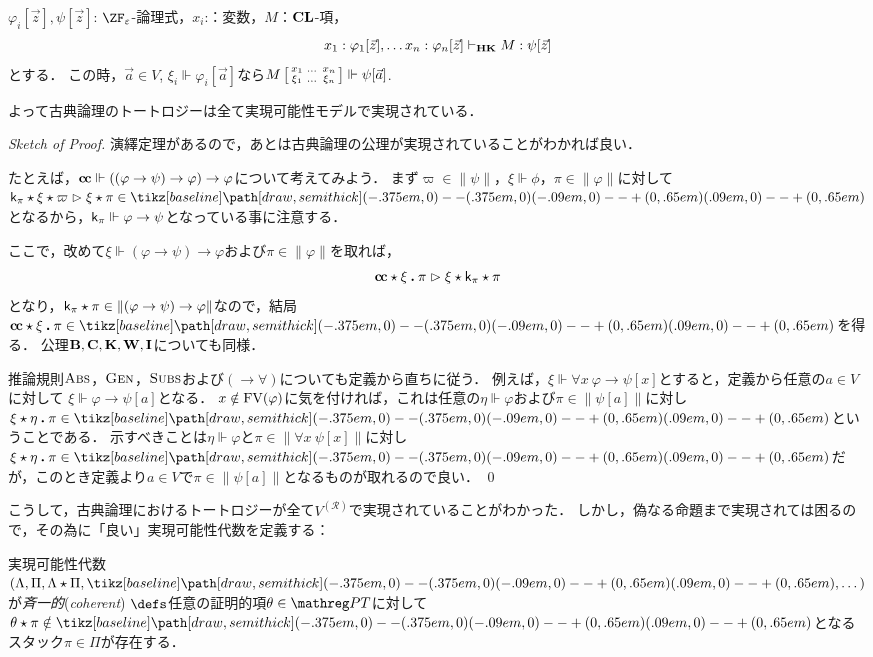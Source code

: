 \documentclass[realisability.tex]{subfiles}
\begin{document}
\begin{lemma}
 $\varphi_i[\vec{z}], \psi[\vec{z}]$: $\ZF_\varepsilon$-論理式，$x_i$:：変数，$M$：$\mathord{\mathbf{CL}}$-項，
 \[
  x_1 : \varphi_1[\vec{z}], \dots x_n : \varphi_n[\vec{z}] \vdash_{\mathord{\mathbf{HK}}} M: \psi[\vec{z}]
 \]
 とする．
 この時，$\vec{a} \in V$, $\xi_i \Vdash \varphi_i[\vec{a}]$なら$M\left[\begin{smallmatrix}x_1 & \dots & x_n\\\xi_1 & \dots & \xi_n\end{smallmatrix}\right] \Vdash \psi[\vec{a}]$.

 よって古典論理のトートロジーは全て実現可能性モデルで実現されている．
\end{lemma}
\begin{proof}[Sketch of Proof]
 演繹定理があるので，あとは古典論理の公理が実現されていることがわかれば良い．

 たとえば，$\mathsf{\mathbf{c\hspace{-1pt}c}} \Vdash ((\varphi \to \psi) \to \varphi) \to \varphi$について考えてみよう．
 まず$\varpi \in \|\psi\|$，$\xi \Vdash \phi$，$\pi \in \|\varphi\|$に対して$\conti_\pi \cons \xi \cons \varpi \reds \xi \cons \pi \in \pole$となるから，$\mathsf{k}_\pi \Vdash \varphi \to \psi$となっている事に注意する．

 ここで，改めて$\xi \Vdash (\varphi \to \psi) \to \varphi$および$\pi \in \|\varphi\|$を取れば，
 \[
  \mathsf{\mathbf{c\hspace{-1pt}c}} \mathbin{\star} \xi \mathbin{\boldsymbol{.}} \pi
 \mathrel{\rhd} \xi \mathbin{\star} \mathsf{k}_\pi \mathbin{\star} \pi
 \]
 となり，$\mathsf{k}_\pi \mathbin{\star} \pi \in \|(\varphi \to \psi) \to \varphi\|$なので，結局$\cc \cons \xi \push \pi \in \pole$を得る．
 公理$\mathsf{\mathbf{B}}, \mathsf{\mathbf{C}}, \mathsf{\mathbf{K}}, \mathsf{\mathbf{W}}, \mathsf{\mathbf{I}}$についても同様．

 推論規則$\mathord{\textsc{Abs}}$，$\mathord{\textsc{Gen}}$，$\mathord{\textsc{Subs}}$および$({\rightarrow}{\forall})$についても定義から直ちに従う．
 例えば，$\xi \Vdash \forall x \: \varphi \to \psi[x]$とすると，定義から任意の$a \in V$に対して
 $\xi \Vdash \varphi \to \psi[a]$となる．
 $x \notin \operatorname{FV}(\varphi)$に気を付ければ，これは任意の$\eta \Vdash \varphi$および$\pi \in \|\psi[a]\|$に対し$\xi \cons \eta \push \pi \in \pole$ということである．
 示すべきことは$\eta \Vdash \varphi$と$\pi \in \|\forall x\: \psi[x]\|$に対し$\xi \cons \eta \push \pi \in \pole$だが，このとき定義より$a \in V$で$\pi \in \|\psi[a]\|$となるものが取れるので良い． \qed
\end{proof}

こうして，古典論理におけるトートロジーが全て$V^{(\mathcal{R})}$で実現されていることがわかった．
しかし，偽なる命題まで実現されては困るので，その為に「良い」実現可能性代数を定義する：

\begin{definition}
 実現可能性代数$(\Lambda, \Pi, \Lambda \cons \Pi, \pole, \dots)$が\emph{斉一的}(\emph{coherent}) $\defs$任意の証明的項$\theta \in \PT$に対して$\theta \cons \pi \notin \pole$となるスタック$\pi \in \Pi$が存在する．
\end{definition}
\end{document}
